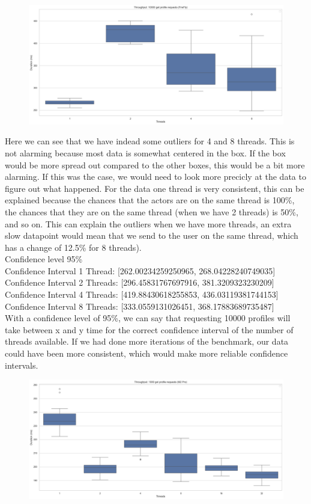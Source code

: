\documentclass[a4paper]{article}
\begin{document}
\begin{figure}[H]
	\centering
	\includegraphics[width = \linewidth]{Images/ThroughputBoxFirefly.png}
	\caption{}
\end{figure}
Here we can see that we have indead some outliers for 4 and 8 threads. This is not alarming because most data is somewhat centered in the box. If the box would be more spread out compared to the other boxes, this would be a bit more alarming. If this was the case, we would need to look more precicly at the data to figure out what happened. 
For the data one thread is very consistent, this can be explained because the chances that the actors are on the same thread is 100\%, the chances that they are on the same thread (when we have 2 threads) is 50\%, and so on. This can explain the outliers when we have more threads, an extra slow datapoint would mean that we send to the user on the same thread, which has a change of 12.5\% for 8 threads).  \\

Confidence level 95\%\\
Confidence Interval 1 Thread: [262.00234259250965, 268.04228240749035]\\
Confidence Interval 2 Threads: [296.45831767697916, 381.3209323230209]\\
Confidence Interval 4 Threads: [419.88430618255853, 436.03119381744153]\\
Confidence Interval 8 Threads: [333.0559131026451, 368.17883689735487]\\

With a confidence level of 95\%, we can say that requesting 10000 profiles will take between x and y time for the correct confidence interval of the number of threads available. If we had done more iterations of the benchmark, our data could have been more consistent, which would 
make more reliable confidence intervals. 
\begin{figure}[H]
	\centering
	\includegraphics[width = \linewidth]{Images/ThroughputBox.png}
	\caption{}
\end{figure}
\end{document}
